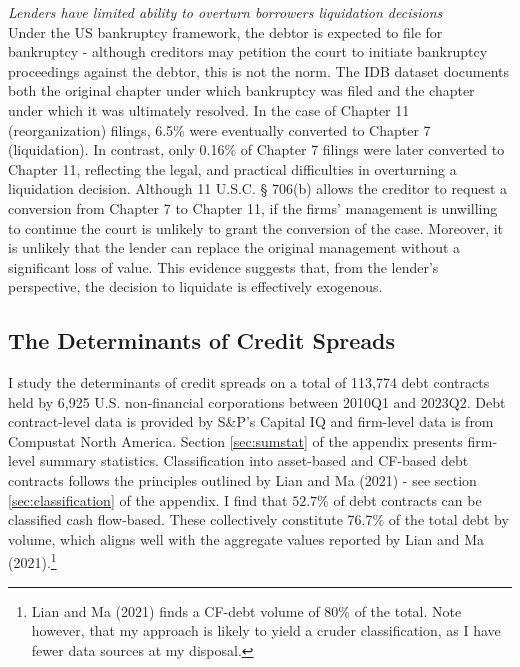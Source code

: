 \documentclass[12pt]{article}
\begin{document}
\noindent \textit{Lenders have limited ability to overturn borrowers liquidation decisions} \\ 
Under the US bankruptcy framework, the debtor is expected to file for bankruptcy - although creditors may petition the court to initiate bankruptcy proceedings against the debtor, this is not the norm. The IDB dataset documents both the original chapter under which bankruptcy was filed and the chapter under which it was ultimately resolved. In the case of Chapter 11 (reorganization) filings, 6.5\% were eventually converted to Chapter 7 (liquidation). In contrast, only 0.16\% of Chapter 7 filings were later converted to Chapter 11, reflecting the legal, and practical difficulties in overturning a liquidation decision. Although 11 U.S.C. § 706(b) allows the creditor to request a conversion from Chapter 7 to Chapter 11, if the firms' management is unwilling to continue the court is unlikely to grant the conversion of the case. Moreover, it is unlikely that the lender can replace the original management without a significant loss of value. This evidence suggests that, from the lender's perspective, the decision to liquidate is effectively exogenous.

\subsection{The Determinants of Credit Spreads \label{sec:emp liqrisk}} 

I study the determinants of credit spreads on a total of 113,774 debt contracts held by 6,925 U.S. non-financial corporations between 2010Q1 and 2023Q2. Debt contract-level data is provided by S\&P's Capital IQ and firm-level data is from Compustat North America. Section \ref{sec:sumstat} of the appendix presents firm-level summary statistics. Classification into asset-based and CF-based debt contracts follows the principles outlined by Lian and Ma (2021) - see section \ref{sec:classification} of the appendix. I find that $52.7\%$ of debt contracts can be classified cash flow-based. These collectively constitute 76.7\% of the total debt by volume, which aligns well with the aggregate values reported by Lian and Ma (2021).\footnote{Lian and Ma (2021) finds a CF-debt volume of 80\% of the total. Note however, that my approach is likely to yield a cruder classification, as I have fewer data sources at my disposal.}  
 
\end{document}
